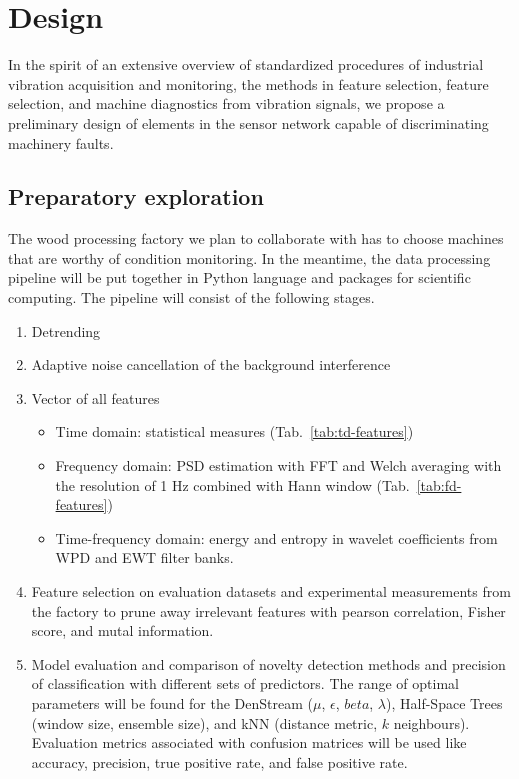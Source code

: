 \chapter{Design} \label{section:design}
In the spirit of an extensive overview of standardized procedures of industrial vibration acquisition and monitoring, the methods in feature selection, feature selection, and machine diagnostics from vibration signals, we propose a preliminary design of elements in the sensor network capable of discriminating machinery faults.

\section{Preparatory exploration}
The wood processing factory we plan to collaborate with has to choose machines that are worthy of condition monitoring. In the meantime, the data processing pipeline will be put together in Python language and packages for scientific computing. The pipeline will consist of the following stages.

\begin{enumerate}
    \itemsep0pt
    \item Detrending
    \item Adaptive noise cancellation of the background interference
    \item Vector of all features
    \begin{itemize}
        \itemsep0pt
        \item Time domain: statistical measures (Tab.~\ref{tab:td-features})
        \item Frequency domain: PSD estimation with FFT and Welch averaging with the resolution of 1 Hz combined with Hann window (Tab.~\ref{tab:fd-features})
        \item Time-frequency domain: energy and entropy in wavelet coefficients from WPD and EWT filter banks.
    \end{itemize}
    \item Feature selection on evaluation datasets and experimental measurements from the factory to prune away irrelevant features with pearson correlation, Fisher score, and mutal information.
    \item Model evaluation and comparison of novelty detection methods and precision of classification with different sets of predictors. The range of optimal parameters will be found for the DenStream ($\mu$, $\epsilon$, $beta$, $\lambda$), Half-Space Trees (window size, ensemble size), and kNN (distance metric, $k$ neighbours). Evaluation metrics associated with confusion matrices will be used like accuracy, precision, true positive rate, and false positive rate.
\end{enumerate}

